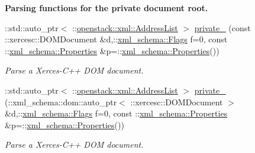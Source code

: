 \begin{Indent}{\bf Parsing functions for the private document root.}
\begin{DoxyCompactItemize}
::std::auto\_\-ptr$<$ ::\hyperlink{classopenstack_1_1xml_1_1AddressList}{openstack::xml::AddressList} $>$ \hyperlink{namespaceopenstack_1_1xml_ad465c459924ed8f3e7e825b9bb279df0}{private\_\-} (const ::xercesc::DOMDocument \&d,::\hyperlink{namespacexml__schema_affb4c227cbd9aa7453dd1dc5a1401943}{xml\_\-schema::Flags} f=0, const ::\hyperlink{namespacexml__schema_ad27ce19a7ee1d3b1064092648898f64c}{xml\_\-schema::Properties} \&p=::\hyperlink{namespacexml__schema_ad27ce19a7ee1d3b1064092648898f64c}{xml\_\-schema::Properties}())
\begin{DoxyCompactList}\small\item\em Parse a Xerces-\/C++ DOM document. \item\end{DoxyCompactList}\item 
::std::auto\_\-ptr$<$ ::\hyperlink{classopenstack_1_1xml_1_1AddressList}{openstack::xml::AddressList} $>$ \hyperlink{namespaceopenstack_1_1xml_a0ded454d6c5d196870b7a01f7d6baa47}{private\_\-} (::xml\_\-schema::dom::auto\_\-ptr$<$ ::xercesc::DOMDocument $>$ \&d,::\hyperlink{namespacexml__schema_affb4c227cbd9aa7453dd1dc5a1401943}{xml\_\-schema::Flags} f=0, const ::\hyperlink{namespacexml__schema_ad27ce19a7ee1d3b1064092648898f64c}{xml\_\-schema::Properties} \&p=::\hyperlink{namespacexml__schema_ad27ce19a7ee1d3b1064092648898f64c}{xml\_\-schema::Properties}())
\begin{DoxyCompactList}\small\item\em Parse a Xerces-\/C++ DOM document. \item\end{DoxyCompactList}\end{DoxyCompactItemize}
\end{Indent}

